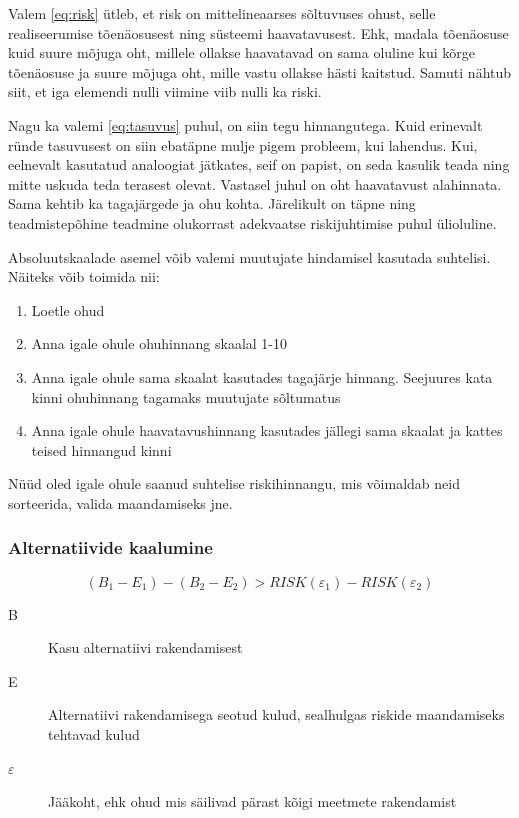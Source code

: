 \documentclass{article}
\begin{document}
Valem \ref{eq:risk} ütleb, et risk on mittelineaarses sõltuvuses ohust, selle realiseerumise tõenäosusest ning süsteemi haavatavusest. Ehk, madala tõenäosuse kuid suure mõjuga oht, millele ollakse haavatavad on sama oluline kui kõrge tõenäosuse ja suure mõjuga oht, mille vastu ollakse hästi kaitstud. Samuti nähtub siit, et iga elemendi nulli viimine viib nulli ka riski. 

Nagu ka valemi \ref{eq:tasuvus} puhul, on siin tegu hinnangutega. Kuid erinevalt ründe tasuvusest on siin ebatäpne mulje pigem probleem, kui lahendus. Kui, eelnevalt kasutatud analoogiat jätkates, seif on papist, on seda kasulik teada ning mitte uskuda teda terasest olevat. Vastasel juhul on oht haavatavust alahinnata. Sama kehtib ka tagajärgede ja ohu kohta. Järelikult on täpne ning teadmistepõhine teadmine olukorrast adekvaatse riskijuhtimise puhul ülioluline.

Absoluutskaalade asemel võib valemi muutujate hindamisel kasutada suhtelisi. Näiteks võib toimida nii:

\begin{enumerate}
	\item Loetle ohud
	\item Anna igale ohule ohuhinnang skaalal 1-10
	\item Anna igale ohule sama skaalat kasutades tagajärje hinnang. Seejuures kata kinni ohuhinnang tagamaks muutujate sõltumatus
	\item Anna igale ohule haavatavushinnang kasutades jällegi sama skaalat ja kattes teised hinnangud kinni
\end{enumerate}

Nüüd oled igale ohule saanud suhtelise riskihinnangu, mis võimaldab neid sorteerida, valida maandamiseks jne.  

\subsubsection{Alternatiivide kaalumine}
\begin{equation}
	(B_1 - E_1) - (B_2 - E_2) > RISK(\varepsilon_1)-RISK(\varepsilon_2)
	\label{eq:alternative}
\end{equation}

\begin{description}
	\item[B] Kasu alternatiivi rakendamisest
	\item[E] Alternatiivi rakendamisega seotud kulud, sealhulgas riskide maandamiseks tehtavad kulud 
	\item[$\varepsilon$] Jääkoht, ehk ohud mis säilivad pärast kõigi meetmete rakendamist
\end{description}
\end{document}

